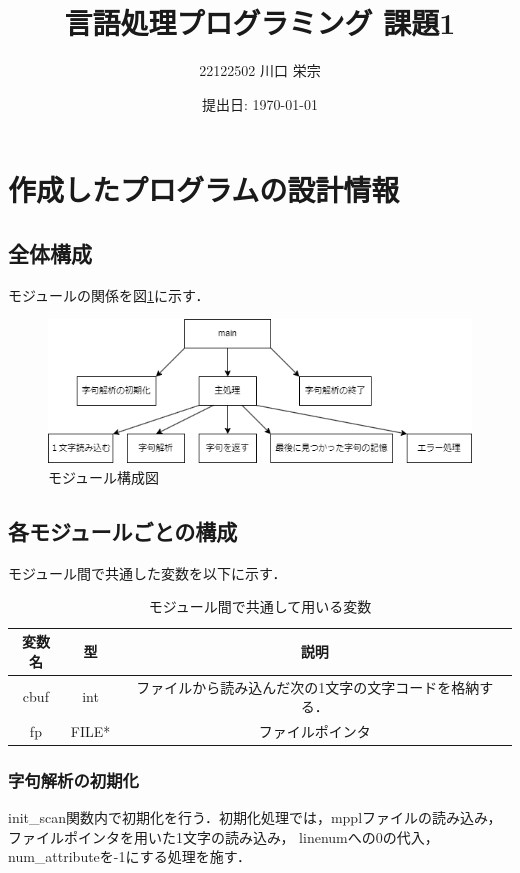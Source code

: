 \documentclass{jlreq}
\title{言語処理プログラミング 課題1}
\author{22122502 川口 栄宗}
\date{提出日: \today}
\begin{document}
\maketitle
\clearpage

\section{作成したプログラムの設計情報}

\subsection{全体構成}
モジュールの関係を図\ref{fig:module_map}に示す．

\begin{figure}[H]
  \centering
  \includegraphics[width=\textwidth]{assets/lpp01_module.png}
  \caption{モジュール構成図}
  \label{fig:module_map}
\end{figure}

\subsection{各モジュールごとの構成}
モジュール間で共通した変数を以下に示す．
\begin{table}[H]
  \centering
  \caption{モジュール間で共通して用いる変数}
  \begin{tabular}{|c|c|c|}
    \hline
    変数名 & 型    & 説明                                                    \\  \hline
    cbuf   & int   & ファイルから読み込んだ次の1文字の文字コードを格納する． \\ \hline
    fp     & FILE* & ファイルポインタ                                        \\ \hline
  \end{tabular}
\end{table}

\subsubsection{字句解析の初期化}
init\_scan関数内で初期化を行う．初期化処理では，mpplファイルの読み込み，ファイルポインタを用いた1文字の読み込み，
linenumへの0の代入，num\_attributeを-1にする処理を施す．
\end{document}
